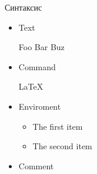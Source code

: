 \begin{frame}[fragile]{Синтаксис}
  \begin{itemize}
    \item Text
      \begin{latexcode}
        Foo Bar Buz
      \end{latexcode}
    \pause  
    \item Command
      \begin{latexcode}
        \LaTeX
      \end{latexcode}
    \pause  
    \item Enviroment
      \begin{latexcode}
        \begin{itemize}
          \item The first item
          \item The second item
        \end{itemize}
      \end{latexcode}
    \pause  
    \item Comment
      \begin{latexcode}
      \end{latexcode}
  \end{itemize}
\end{frame}
